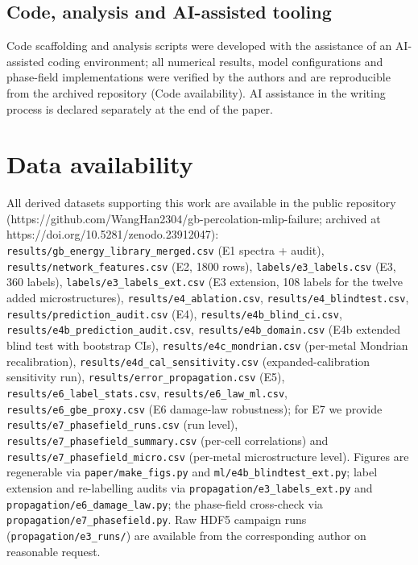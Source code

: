 \documentclass[preprint,12pt]{elsarticle}
\begin{document}
\subsection{Code, analysis and AI-assisted tooling}
Code scaffolding and analysis scripts were developed with the assistance of an AI-assisted coding environment; all numerical results, model configurations and phase-field implementations were verified by the authors and are reproducible from the archived repository (Code availability). AI assistance in the writing process is declared separately at the end of the paper.

\section*{Data availability}

{\sloppy
All derived datasets supporting this work are available in the public repository (\mbox{https://github.com/WangHan2304/gb-percolation-mlip-failure}; archived at \mbox{https://doi.org/10.5281/zenodo.23912047}): \texttt{results/gb\_energy\_library\_merged.csv} (E1 spectra + audit), \texttt{results/network\_features.csv} (E2, 1800 rows), \texttt{labels/e3\_labels.csv} (E3, 360 labels), \texttt{labels/e3\_labels\_ext.csv} (E3 extension, 108 labels for the twelve added microstructures), \texttt{results/e4\_ablation.csv}, \texttt{results/e4\_blindtest.csv}, \texttt{results/prediction\_audit.csv} (E4), \texttt{results/e4b\_blind\_ci.csv}, \texttt{results/e4b\_prediction\_audit.csv}, \texttt{results/e4b\_domain.csv} (E4b extended blind test with bootstrap CIs), \texttt{results/e4c\_mondrian.csv} (per-metal Mondrian recalibration), \texttt{results/e4d\_cal\_sensitivity.csv} (expanded-calibration sensitivity run), \texttt{results/error\_propagation.csv} (E5), \texttt{results/e6\_label\_stats.csv}, \texttt{results/e6\_law\_ml.csv}, \texttt{results/e6\_gbe\_proxy.csv} (E6 damage-law robustness); for E7 we provide \texttt{results/e7\_phasefield\_runs.csv} (run level), \texttt{results/e7\_phasefield\_summary.csv} (per-cell correlations) and \texttt{results/e7\_phasefield\_micro.csv} (per-metal microstructure level). Figures are regenerable via \texttt{paper/make\_figs.py} and \texttt{ml/e4b\_blindtest\_ext.py}; label extension and re-labelling audits via \texttt{propagation/e3\_labels\_ext.py} and \texttt{propagation/e6\_damage\_law.py}; the phase-field cross-check via \texttt{propagation/e7\_phasefield.py}. Raw HDF5 campaign runs (\texttt{propagation/e3\_runs/}) are available from the corresponding author on reasonable request.\par}
\end{document}
